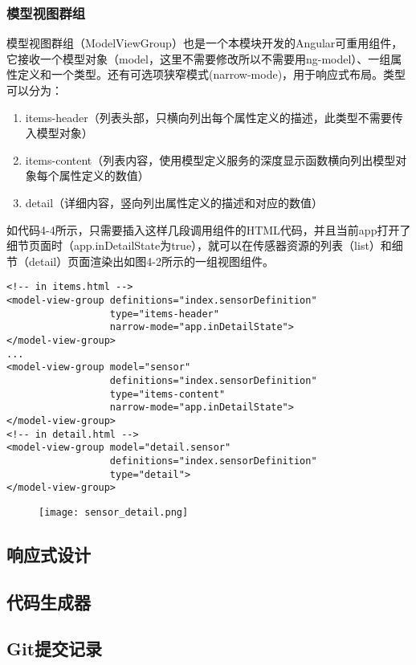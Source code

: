 \subsubsection{模型视图群组}
模型视图群组（ModelViewGroup）也是一个本模块开发的Angular可重用组件，它接收一个模型对象（model，这里不需要修改所以不需要用ng-model）、一组属性定义和一个类型。还有可选项狭窄模式(narrow-mode)，用于响应式布局。类型可以分为：
\begin{enumerate}
  \item items-header（列表头部，只横向列出每个属性定义的描述，此类型不需要传入模型对象）
  \item items-content（列表内容，使用模型定义服务的深度显示函数横向列出模型对象每个属性定义的数值）
  \item detail（详细内容，竖向列出属性定义的描述和对应的数值）
\end{enumerate}
如代码4-4所示，只需要插入这样几段调用组件的HTML代码，并且当前app打开了细节页面时（app.inDetailState为true），就可以在传感器资源的列表（list）和细节（detail）页面渲染出如图4-2所示的一组视图组件。
\begin{lstlisting}[language={HTML5}, caption={传感器列表页面中的模型输入群组代码}]
<!-- in items.html -->
<model-view-group definitions="index.sensorDefinition"
                  type="items-header"
                  narrow-mode="app.inDetailState">
</model-view-group>
...
<model-view-group model="sensor"
                  definitions="index.sensorDefinition"
                  type="items-content"
                  narrow-mode="app.inDetailState">
</model-view-group>
<!-- in detail.html -->
<model-view-group model="detail.sensor"
                  definitions="index.sensorDefinition"
                  type="detail">
</model-view-group>
\end{lstlisting}
\begin{figure}[!htp]
 \centering
 \texttt{[image: sensor\_detail.png]}
\end{figure}
\subsection{响应式设计}


\subsection{代码生成器}
\subsection{Git提交记录}

